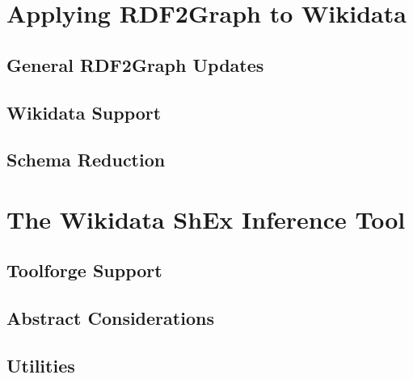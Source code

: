 
\chapter{Applying RDF2Graph to Wikidata}
\label{ch:RDF2Graph+Wikidata}

\section{General RDF2Graph Updates}
\label{sec:RDF2Graph+Wikidata:updates}

\section{Wikidata Support}
\label{sec:RDF2Graph+Wikidata:Wikidata}

\section{Schema Reduction}
\label{sec:RDF2Graph+Wikidata:schema-reduction}


\chapter{The Wikidata ShEx Inference Tool}
\label{ch:wdsi}

\section{Toolforge Support}
\label{sec:wdsi:Toolforge}

\section{Abstract Considerations}
\label{sec:wdsi:abstract}

\section{Utilities}
\label{sec:wdsi:utilities}
